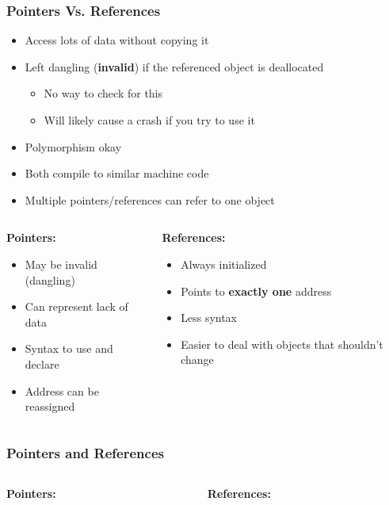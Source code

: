 \documentclass[glossy]{beamer}
\begin{document}
\begin{frame}[fragile=singleslide]
  \frametitle{Pointers Vs. References}

  \begin{itemize}
    \item Access lots of data without copying it
    \item Left dangling (\textbf{invalid}) if the referenced object is deallocated
    \begin{itemize}
      \item No way to check for this
      \item Will likely cause a crash if you try to use it
    \end{itemize}
    \item Polymorphism okay
    \item Both compile to similar machine code
    \item Multiple pointers/references can refer to one object
  \end{itemize}

  \begin{columns}
    \begin{column}{6cm}
      \textbf{Pointers:}
      \begin{itemize}
        \item May be invalid (dangling)
        \item Can represent lack of data
        \item Syntax to use and declare
        \item Address can be reassigned
      \end{itemize}
    \end{column}

    \begin{column}{6cm}
      \textbf{References:}
      \begin{itemize}
        \item Always initialized
        \item Points to \textbf{exactly one} address
        \item Less syntax
        \item Easier to deal with objects that shouldn't change
      \end{itemize}
    \end{column}
  \end{columns}
\end{frame}

\begin{frame}[fragile=singleslide]
  \frametitle{Pointers and References}
  \begin{columns}[t]
    \begin{column}{6cm}
      \textbf{Pointers:}
    \end{column}

    \begin{column}{6cm}
      \textbf{References:}
    \end{column}
  \end{columns}
\end{frame}
\end{document}
